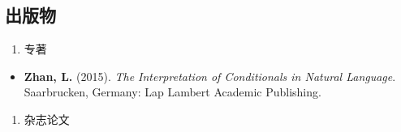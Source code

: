 \documentclass[12pt,]{article}
\providecommand{\tightlist}{%
  \setlength{\itemsep}{0pt}\setlength{\parskip}{0pt}}
\begin{document}
\hypertarget{ux51faux7248ux7269}{%
\subsection{出版物}\label{ux51faux7248ux7269}}

\begin{enumerate}
\def\labelenumi{\arabic{enumi}.}
\tightlist
\item
  专著
\end{enumerate}

\begin{itemize}
\tightlist
\item
  \textbf{Zhan, L.} (2015). \emph{The Interpretation of Conditionals in
  Natural Language}. Saarbrucken, Germany: Lap Lambert Academic
  Publishing.
\end{itemize}

\begin{enumerate}
\def\labelenumi{\arabic{enumi}.}
\setcounter{enumi}{1}
\tightlist
\item
  杂志论文
\end{enumerate}
\end{document}
